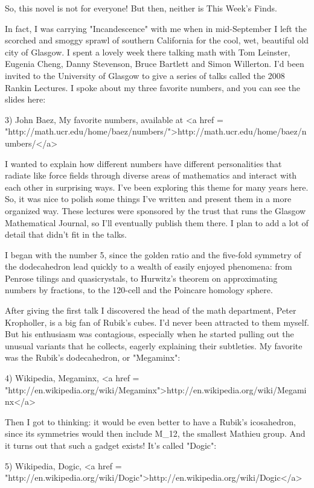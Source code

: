 So, this novel is not for everyone!  But then, neither is 
This Week's Finds.  

In fact, I was carrying "Incandescence" with me when in
mid-September I left the scorched and smoggy sprawl of southern
California for the cool, wet, beautiful old city of Glasgow.  I spent
a lovely week there talking math with Tom Leinster, Eugenia Cheng,
Danny Stevenson, Bruce Bartlett and Simon Willerton.  I'd been invited to the
University of Glasgow to give a series of talks called the 2008 Rankin
Lectures.  I spoke about my three favorite numbers, and you can see
the slides here:

3) John Baez, My favorite numbers, available at
<a href = "http://math.ucr.edu/home/baez/numbers/">http://math.ucr.edu/home/baez/numbers/</a>

I wanted to explain how different numbers have different personalities
that radiate like force fields through diverse areas of mathematics and 
interact with each other in surprising ways.  I've been exploring 
this theme for many years here.  So, it was nice to polish some things
I've written and present them in a more organized way.  These lectures 
were sponsored by the trust that runs the Glasgow Mathematical Journal, 
so I'll eventually publish them there.   I plan to add a lot of detail 
that didn't fit in the talks.

I began with the number 5, since the golden ratio and the five-fold 
symmetry of the dodecahedron lead quickly to a wealth of easily enjoyed 
phenomena: from Penrose tilings and quasicrystals, to Hurwitz's theorem on 
approximating numbers by fractions, to the 120-cell and the Poincare
homology sphere.  

After giving the first talk I discovered the head of the math department, 
Peter Kropholler, is a big fan of Rubik's cubes.  I'd never been attracted 
to them myself.  But his enthusiasm was contagious, especially when he 
started pulling out the unusual variants that he collects, eagerly 
explaining their subtleties.  My favorite was the Rubik's dodecahedron, 
or "Megaminx":

4) Wikipedia, Megaminx, <a href = "http://en.wikipedia.org/wiki/Megaminx">http://en.wikipedia.org/wiki/Megaminx</a>

Then I got to thinking: it would be even better to have a Rubik's 
icosahedron, since its symmetries would then include M_{12}, the smallest 
Mathieu group.  And it turns out that such a gadget exists!  It's 
called "Dogic":

5) Wikipedia, Dogic, <a href = "http://en.wikipedia.org/wiki/Dogic">http://en.wikipedia.org/wiki/Dogic</a>

